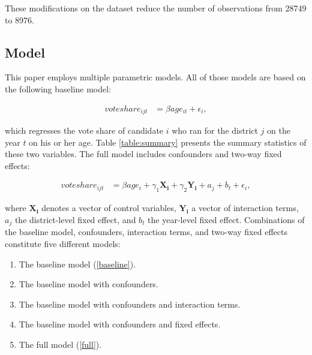\documentclass[a4paper, 12pt]{article}\usepackage[dvipdfmx]{graphicx}\usepackage[]{xcolor}
\begin{document}
These modifications on the dataset reduce the number of observations from 28749 to 8976. 


\subsection{Model} \label{ch4.2}

This paper employs multiple parametric models. All of those models are based on the following baseline model: 

\begin{align}
voteshare_{ijt} &= \beta age_{it}  + \epsilon_i, \label{baseline}
\end{align}

\noindent which regresses the vote share of candidate $i$ who ran for the district $j$ on the year $t$ on his or her age. Table \ref{table:summary} presents the summary statistics of these two variables. The full model includes confounders and two-way fixed effects: 

\begin{align}
voteshare_{ijt} &= \beta age_i + \gamma_1 \mathbf{X_i} + \gamma_2 \mathbf{Y_i} + a_{j} + b_{t} + \epsilon_i, \label{full}
\end{align}

\noindent where $\mathbf{X_i}$ denotes a vector of control variables, $\mathbf{Y_i}$ a vector of interaction terms, $a_{j}$ the district-level fixed effect, and $b_{t}$ the year-level fixed effect. Combinations of the baseline model, confounders, interaction terms, and two-way fixed effects constitute five different models: 

\begin{enumerate}
  \item The baseline model (\ref{baseline}).

  \item The baseline model with confounders. 
  
  \item The baseline model with confounders and interaction terms. 
  
  \item The baseline model with confounders and fixed effects. 
  
  \item The full model (\ref{full}). 
\end{enumerate}
\end{document}
